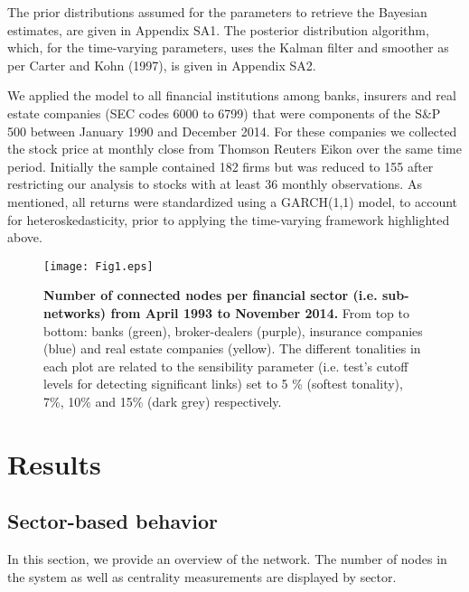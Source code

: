 \documentclass[a4paper,10pt]{article}
\begin{document}
The prior distributions assumed for the parameters to retrieve the Bayesian estimates, are given in Appendix SA1. The 
posterior distribution algorithm, which, for the time-varying parameters, uses the Kalman filter and smoother as per Carter and Kohn 
(1997), is given in Appendix SA2. 

We applied the model to all financial institutions among banks, insurers and real estate companies (SEC codes 6000 to 6799) 
that were components of the S\&P 500 between January 1990 and December 2014. For these companies we collected the stock price 
at monthly close from Thomson Reuters Eikon over the same time period. Initially the sample contained 182 firms but was 
reduced to 155 after restricting our analysis to stocks with at least 36 monthly observations. As mentioned, all returns were 
standardized using a GARCH(1,1) model, to account for heteroskedasticity, prior to applying the time-varying framework 
highlighted above.
\\

\begin{figure}[!h]
\centering
\texttt{[image: Fig1.eps]}
\caption{{\bf Number of connected nodes per financial sector (i.e. sub-networks) from April 1993 to November 2014.} From top 
to bottom: banks (green), broker-dealers (purple), insurance companies (blue) and real estate companies (yellow). The different
tonalities in each plot are related to the sensibility parameter (i.e. test's cutoff levels  for detecting  significant links)
set to 5 \% (softest tonality), 7\%, 10\% and 15\% (dark grey) respectively. }
\label{fig:1}
\end{figure}

\section{Results}
\subsection{Sector-based behavior}
In this section, we provide an overview of the network. The number of nodes in the system as well as centrality measurements 
are displayed by sector.  
  
\end{document}
